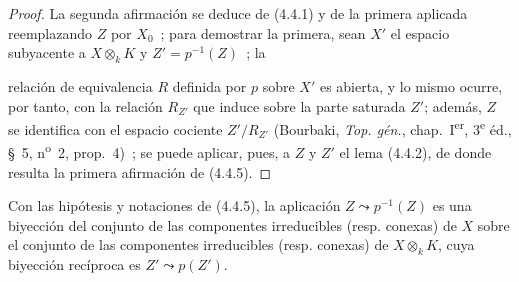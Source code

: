 \begin{proof}
La segunda afirmación se deduce de (4.4.1) y de la primera aplicada reemplazando
$Z$ por $X_0$~; para demostrar la primera, sean $X'$ el espacio subyacente a
$X\otimes_k K$ y $Z'=p^{-1}(Z)$~; la


relación de equivalencia $R$ definida por $p$ sobre $X'$ es abierta, y lo mismo
ocurre, por tanto, con la relación $R_{Z'}$ que induce sobre la parte saturada
$Z'$; además, $Z$ se identifica con el espacio cociente $Z'/R_{Z'}$ (Bourbaki,
\emph{Top. gén.}, chap.~I\textsuperscript{er}, 3\textsuperscript{e} éd.,
\S~5, n\textsuperscript{o}~2, prop.~4)~; se puede aplicar, pues, a $Z$ y $Z'$ el
lema (4.4.2), de donde resulta la primera afirmación de (4.4.5).
\end{proof}

\begin{corollary}[4.4.6]
\label{IV.2.4.4.6-fr}
Con las hipótesis y notaciones de \textup{(4.4.5)}, la aplicación
$Z\leadsto p^{-1}(Z)$ es una biyección del conjunto de las componentes
irreducibles \textup{(resp.} conexas\textup{)} de $X$ sobre el conjunto de las componentes
irreducibles \textup{(resp.} conexas\textup{)} de $X\otimes_k K$, cuya biyección recíproca es
$Z'\leadsto p(Z')$.
\end{corollary}

